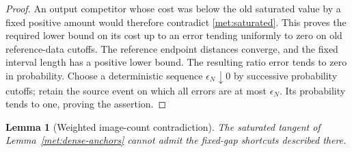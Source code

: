 \documentclass[11pt]{article}
\numberwithin{equation}{section}
\newtheorem{lemma}[theorem]{Lemma}
\theoremstyle{definition}
\theoremstyle{remark}
\newcommand{\1}{\mathbf 1}
\begin{document}
\begin{proof}
An output competitor whose cost was below the old saturated value
by a fixed positive amount would therefore contradict
\eqref{met:saturated}.  This proves the required lower bound on its
cost up to an error tending uniformly to zero on old reference-data
cutoffs.  The reference endpoint distances converge, and the fixed
interval length has a positive lower bound.  The resulting ratio
error tends to zero in probability.  Choose a deterministic sequence
$\epsilon_N\downarrow0$ by successive probability cutoffs; retain
the source event on which all errors are at most $\epsilon_N$.
Its probability tends to one, proving the assertion.
\end{proof}

\begin{lemma}[Weighted image-count contradiction]
\label{met:weighted-count}
The saturated tangent of Lemma~\ref{met:dense-anchors} cannot admit
the fixed-gap shortcuts described there.
\end{lemma}
\end{document}
